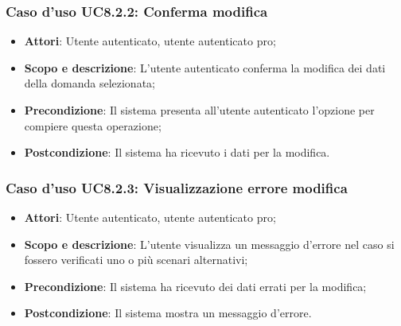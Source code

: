 	\subsubsection{Caso d'uso UC8.2.2: Conferma modifica}
	\begin{itemize}
		\item
			\textbf{Attori}: Utente autenticato, utente autenticato pro;
		\item
			\textbf{Scopo e descrizione}: L'utente autenticato conferma la modifica dei dati della domanda selezionata;
		\item		
			\textbf{Precondizione}: Il sistema presenta all'utente autenticato l'opzione per compiere questa operazione;
		\item
			\textbf{Postcondizione}: Il sistema ha ricevuto i dati per la modifica.
	\end{itemize}		
	\subsubsection{Caso d'uso UC8.2.3: Visualizzazione errore modifica}
	\begin{itemize}
		\item
			\textbf{Attori}: Utente autenticato, utente autenticato pro;
		\item
			\textbf{Scopo e descrizione}: L'utente visualizza un messaggio d'errore nel caso si fossero verificati uno o più scenari alternativi;
		\item		
			\textbf{Precondizione}: Il sistema ha ricevuto dei dati errati per la modifica;
		\item
			\textbf{Postcondizione}: Il sistema mostra un messaggio d'errore.
	\end{itemize}	
	
